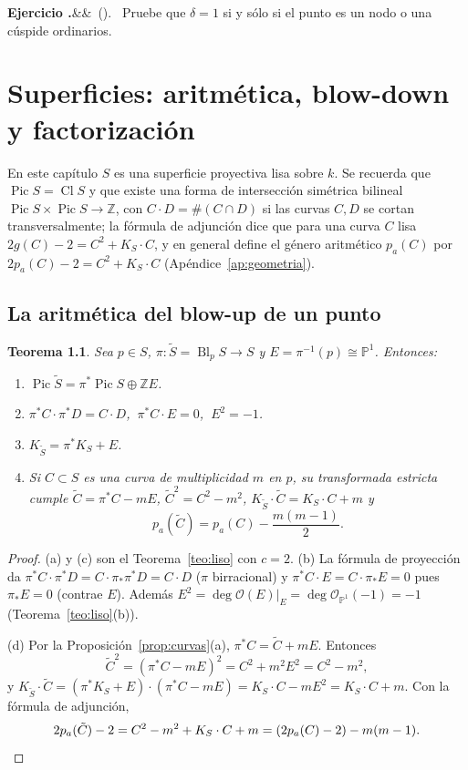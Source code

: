 \documentclass[11pt,a4paper,oneside]{book}
\newcommand{\Bl}{\operatorname{Bl}}
\newcommand{\Pic}{\operatorname{Pic}}
\newcommand{\Cl}{\operatorname{Cl}}
\newcommand{\PP}{\mathbb{P}}
\newcommand{\ZZ}{\mathbb{Z}}
\newcommand{\cO}{\mathcal{O}}
\theoremstyle{plain}
\newtheorem{teorema}{Teorema}[chapter]
\theoremstyle{definition}
\theoremstyle{remark}
\newcounter{ejer}[chapter]
\renewcommand{\theejer}{\thechapter.\arabic{ejer}}
\newenvironment{ejercicio}[1][]{\refstepcounter{ejer}\par\medskip\noindent\textbf{Ejercicio \theejer}\ifx&#1&\else\ (#1)\fi.\ }{\par}
\begin{document}
\begin{ejercicio}\label{ej:c5-4}
Pruebe que $\delta=1$ si y sólo si el punto es un nodo o una cúspide ordinarios.
\end{ejercicio}

\chapter{Superficies: aritmética, blow-down y factorización}\label{cap:superficies}

En este capítulo $S$ es una superficie proyectiva lisa sobre $k$. Se recuerda que $\Pic S=\Cl S$ y que existe una forma de intersección simétrica bilineal $\Pic S\times\Pic S\to\ZZ$, con $C\cdot D=\#(C\cap D)$ si las curvas $C,D$ se cortan transversalmente; la fórmula de adjunción dice que para una curva $C$ lisa $2g(C)-2=C^2+K_S\cdot C$, y en general define el género aritmético $p_a(C)$ por $2p_a(C)-2=C^2+K_S\cdot C$ (Apéndice~\ref{ap:geometria}).

\section{La aritmética del blow-up de un punto}

\begin{teorema}\label{teo:aritmetica}
Sea $p\in S$, $\pi:\tilde S=\Bl_pS\to S$ y $E=\pi^{-1}(p)\cong\PP^1$. Entonces:
\begin{enumerate}[label=(\alph*)]
\item $\Pic\tilde S=\pi^*\Pic S\oplus\ZZ E$.
\item $\pi^*C\cdot\pi^*D=C\cdot D$, $\ \pi^*C\cdot E=0$, $\ E^2=-1$.
\item $K_{\tilde S}=\pi^*K_S+E$.
\item Si $C\subset S$ es una curva de multiplicidad $m$ en $p$, su transformada estricta cumple $\tilde C=\pi^*C-mE$, $\tilde C^2=C^2-m^2$, $K_{\tilde S}\cdot\tilde C=K_S\cdot C+m$ y
\[
p_a(\tilde C)=p_a(C)-\frac{m(m-1)}2 .
\]
\end{enumerate}
\end{teorema}

\begin{proof}
(a) y (c) son el Teorema~\ref{teo:liso} con $c=2$. (b) La fórmula de proyección da $\pi^*C\cdot\pi^*D=C\cdot\pi_*\pi^*D=C\cdot D$ ($\pi$ birracional) y $\pi^*C\cdot E=C\cdot\pi_*E=0$ pues $\pi_*E=0$ (contrae $E$). Además $E^2=\deg\cO(E)|_E=\deg\cO_{\PP^1}(-1)=-1$ (Teorema~\ref{teo:liso}(b)).

(d) Por la Proposición~\ref{prop:curvas}(a), $\pi^*C=\tilde C+mE$. Entonces
\[
\tilde C^2=(\pi^*C-mE)^2=C^2+m^2E^2=C^2-m^2,
\]
y $K_{\tilde S}\cdot\tilde C=(\pi^*K_S+E)\cdot(\pi^*C-mE)=K_S\cdot C-mE^2=K_S\cdot C+m$. Con la fórmula de adjunción,
\[
2p_a(\tilde C)-2=C^2-m^2+K_S\cdot C+m=(2p_a(C)-2)-m(m-1).\qedhere
\]
\end{proof}
\end{document}
